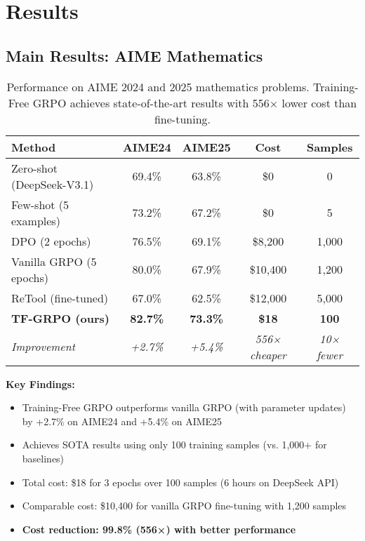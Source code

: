 \documentclass[11pt,a4paper]{article}
\begin{document}
\section{Results}
\label{sec:results}

\subsection{Main Results: AIME Mathematics}

\begin{table}[h]
\centering
\caption{Performance on AIME 2024 and 2025 mathematics problems. Training-Free GRPO achieves state-of-the-art results with 556× lower cost than fine-tuning.}
\label{tab:aime}
\begin{tabular}{@{}lcccc@{}}
\toprule
\textbf{Method} & \textbf{AIME24} & \textbf{AIME25} & \textbf{Cost} & \textbf{Samples} \\
\midrule
Zero-shot (DeepSeek-V3.1) & 69.4\% & 63.8\% & \$0 & 0 \\
Few-shot (5 examples) & 73.2\% & 67.2\% & \$0 & 5 \\
\midrule
DPO (2 epochs) & 76.5\% & 69.1\% & \$8,200 & 1,000 \\
Vanilla GRPO (5 epochs) & 80.0\% & 67.9\% & \$10,400 & 1,200 \\
ReTool (fine-tuned) & 67.0\% & 62.5\% & \$12,000 & 5,000 \\
\midrule
\textbf{TF-GRPO (ours)} & \textbf{82.7\%} & \textbf{73.3\%} & \textbf{\$18} & \textbf{100} \\
\quad \textit{Improvement} & \textit{+2.7\%} & \textit{+5.4\%} & \textit{556× cheaper} & \textit{10× fewer} \\
\bottomrule
\end{tabular}
\end{table}

\textbf{Key Findings:}
\begin{itemize}
    \item Training-Free GRPO outperforms vanilla GRPO (with parameter updates) by +2.7\% on AIME24 and +5.4\% on AIME25
    \item Achieves SOTA results using only 100 training samples (vs. 1,000+ for baselines)
    \item Total cost: \$18 for 3 epochs over 100 samples (6 hours on DeepSeek API)
    \item Comparable cost: \$10,400 for vanilla GRPO fine-tuning with 1,200 samples
    \item \textbf{Cost reduction: 99.8\% (556×) with better performance}
\end{itemize}
\end{document}
